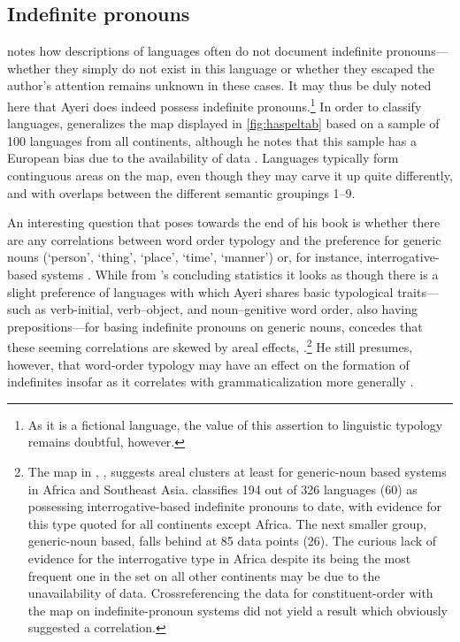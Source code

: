 \xe


\subsection{Indefinite pronouns}
\label{subsec:indefpro}

\citet[56]{haspelmath1997} notes how descriptions of languages often do not 
document indefinite pronouns---whether they simply do not exist in this 
language or whether they escaped the author's attention remains unknown in 
these cases. It may thus be duly noted here that Ayeri does indeed possess 
indefinite pronouns.\footnote{As it is a fictional language, the value of this 
assertion to linguistic typology remains doubtful, however.} In order to 
classify languages, \citet{haspelmath1997} generalizes the map displayed 
in \autoref{fig:haspeltab} based on a sample of 100 languages from all 
continents, although he notes that this sample has a European bias due to the 
availability of data \citep[2]{haspelmath1997}. Languages typically form 
continguous areas on the map, even though they may carve it up quite 
differently, and with overlaps between the different semantic groupings 1--9.

An interesting question that \citet{haspelmath1997} poses towards the end
of his book is whether there are any correlations between word order typology
and the preference for generic nouns (`person', `thing', `place', `time',
`manner') or, for instance, interrogative-based systems
\citep[239--241]{haspelmath1997}. While from \citet{haspelmath1997}'s
concluding statistics it looks as though there is a slight preference of
languages with which Ayeri shares basic typological traits---such as 
verb-initial, verb–object, and noun–genitive word order, also having 
prepositions---for basing indefinite pronouns on generic nouns,
\citet{haspelmath1997} concedes that these seeming correlations are skewed
by areal effects, .\footnote{The map in ,
\citet{wals46A}, suggests areal clusters at least for generic-noun based 
systems in Africa and Southeast Asia.  classifies 194 out of 
326 languages (60\pct) as possessing interrogative-based indefinite pronouns 
to date, with evidence for this type quoted for all continents except Africa. 
The next smaller group, generic-noun based, falls behind at 85 data points 
(26\pct). The curious lack of evidence for the interrogative type in Africa 
despite its being the most frequent one in the set on all other continents may 
be due to the unavailability of data. Crossreferencing the  
data for constituent-order with the map on indefinite-pronoun systems did not 
yield a result which obviously suggested a correlation.} He still presumes, 
however, that word-order typology may have an effect on the formation of 
indefinites insofar as it correlates with grammaticalization more generally 
\citep[239]{haspelmath1997}.

